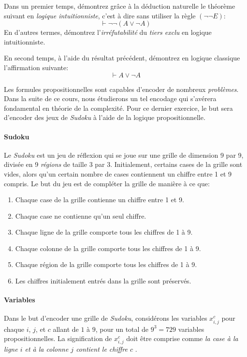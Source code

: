 \documentclass[12pt,french,a4paper]{article}
\begin{document}
\vspace{3cm}

\begin{question}
Dans un premier temps, démontrez grâce à la déduction naturelle le théorème suivant en \textit{logique intuitionniste}, c'est à dire sans utiliser la règle $(\neg{}\neg{}E)$:
\[
\vdash \neg\neg(A \vee \neg A)
\]
En d'autres termes, démontrez l'\textit{irréfutabilité} du \textit{tiers exclu} en logique intuitionniste.

En second temps, à l'aide du résultat précédent, démontrez en logique classique l'affirmation suivante:
\[
\vdash A \vee \neg A
\]

\end{question}

\newpage

\begin{question}
Les formules propositionnelles sont capables d'encoder de nombreux \textit{problèmes}.
Dans la suite de ce cours, nous étudierons un tel encodage qui s'avérera fondamental en théorie de la complexité.
Pour ce dernier exercice, le but sera d'encoder des jeux de \textit{Sudoku} à l'aide de la logique propositionnelle.

\paragraph{Sudoku}

Le \textit{Sudoku} est un jeu de réflexion qui se joue sur une grille de dimension 9 par 9, divisée en 9 \textit{régions} de taille 3 par 3.
Initialement, certains cases de la grille sont vides, alors qu'un certain nombre de cases contiennent un chiffre entre 1 et 9 compris.
Le but du jeu est de compléter la grille de manière à ce que:
\begin{enumerate}
\item
Chaque case de la grille contienne un chiffre entre 1 et 9.
\item
Chaque case ne contienne qu'un seul chiffre.
\item
Chaque ligne de la grille comporte tous les chiffres de 1 à 9.
\item
Chaque colonne de la grille comporte tous les chiffres de 1 à 9.
\item
Chaque région de la grille comporte tous les chiffres de 1 à 9.
\item
Les chiffres initialement entrés dans la grille sont préservés.
\end{enumerate}

\paragraph{Variables} Dans le but d'encoder une grille de \textit{Sudoku}, considérons les variables $x_{i,j}^c$ pour chaque $i$, $j$, et $c$ allant de $1$ à $9$, pour un total de $9^3 = 729$ variables propositionnelles. La signification de $x_{i,j}^c$ doit être comprise comme \og \textit{la case à la ligne $i$ et à la colonne $j$ contient le chiffre $c$} \fg{}.


\end{question}
\end{document}
